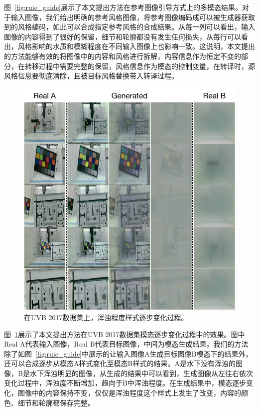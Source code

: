 图~\ref{fig:ruie_guide}展示了本文提出方法在参考图像引导方式上的多模态结果。对于输入图像，我们给出明确的参考风格图像，将参考图像编码成可以被生成器获取到的风格编码，如此可以合成指定参考风格的合成结果。从每一列可以看出，输入图像的内容得到了很好的保留，细节和轮廓都没有发生任何损失，从每行可以看出，风格影响的水质和模糊程度在不同输入图像上也影响一致。这说明，本文提出的方法能够有效的将图像中的内容和风格进行拆解，内容信息作为恒定不变的部分，在转移过程中需要完整的保留，风格信息作为模态的控制变量，在转译时，源风格信息要彻底清除，且被目标风格替换带入转译过程。

\begin{figure}[ht]
    \centering
	\includegraphics[width=\textwidth]{figures/UVB-change.pdf}
	\caption{在UVB 2017数据集上，浑浊程度样式逐步变化过程。}
	\label{fig:uvb-change}
\end{figure}

图~\ref{fig:uvb-change}展示了本文提出方法在UVB 2017数据集模态逐步变化过程中的效果。图中Real A代表输入图像，Real B代表目标图像，中间为模态生成结果。我们的方法除了如图~\ref{fig:ruie_guide}中展示的让输入图像A生成目标图像B模态下的结果外，还可以合成逐步从模态A样式变化至模态B样式的结果。A是水下没有浑浊的图像，B是水下浑浊明显的图像，从生成的结果中可以看到，生成图像从左往右依次变化过程中，浑浊度不断增加，趋向于B中浑浊程度。在生成结果中，模态逐步变化，图像中的内容保持不变，仅仅是浑浊程度这个样式上发生了改变，内容的颜色、细节和轮廓都保存完整。


